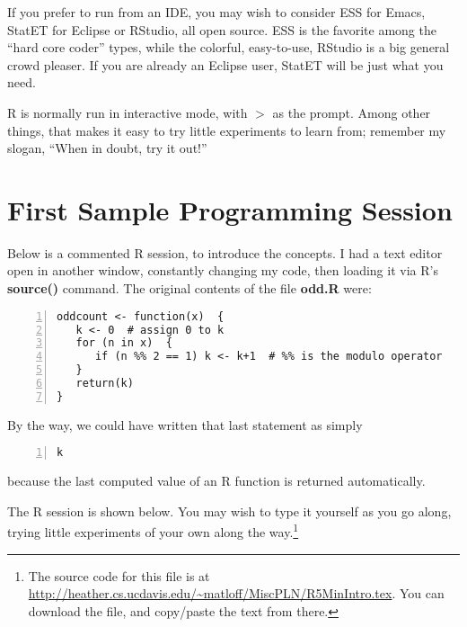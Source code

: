 If you prefer to run from an IDE, you may wish to consider ESS for
Emacs, StatET for Eclipse or RStudio, all open source.  ESS is the
favorite among the ``hard core coder'' types, while the colorful,
easy-to-use, RStudio is a big general crowd pleaser.  If you are already
an Eclipse user, StatET will be just what you need.

R is normally run in interactive mode, with $>$ as the prompt.  Among 
other things, that makes it easy to try little experiments to learn
from; remember my slogan, ``When in doubt, try it out!''

\section{First Sample Programming Session}

Below is a commented R session, to introduce the concepts. I had a text
editor open in another window, constantly changing my code, then loading
it via R's {\bf source()} command.  The original contents of the file
{\bf odd.R} were:

\begin{lstlisting}[numbers=left]
oddcount <- function(x)  {
   k <- 0  # assign 0 to k
   for (n in x)  {
      if (n %% 2 == 1) k <- k+1  # %% is the modulo operator
   }
   return(k)
}
\end{lstlisting}

By the way, we could have written that last statement as simply

\begin{lstlisting}[numbers=left]
   k
\end{lstlisting}

because the last computed value of an R function is returned
automatically.

The R session is shown below.  You may wish to type it yourself as you
go along, trying little experiments of your own along the
way.\footnote{The source code for this file is at
\url{http://heather.cs.ucdavis.edu/~matloff/MiscPLN/R5MinIntro.tex}.
You can download the file, and copy/paste the text from there.}

